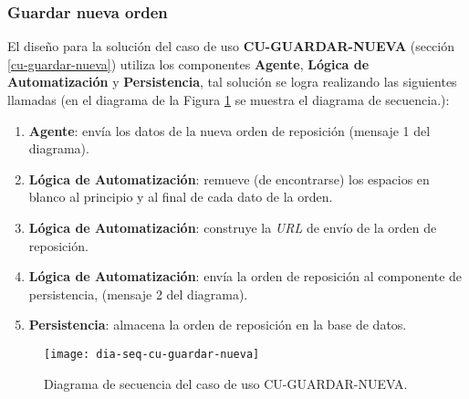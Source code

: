 \subsubsection{Guardar nueva orden}
El diseño para la solución del caso de uso \textbf{CU-GUARDAR-NUEVA} (sección \ref{cu-guardar-nueva}) utiliza los componentes \textbf{Agente}, \textbf{Lógica de Automatización} y \textbf{Persistencia}, tal solución se logra realizando las siguientes llamadas (en el diagrama de la Figura \ref{fig:dia-seq-cu-guardar-nueva} se muestra el diagrama de secuencia.):
\begin{enumerate}
	\item \textbf{Agente}: envía los datos de la nueva orden de reposición (mensaje 1 del diagrama).
	\item \textbf{Lógica de Automatización}: remueve (de encontrarse) los espacios en blanco al principio y al final de cada dato de la orden.
	\item \textbf{Lógica de Automatización}: construye la \textit{URL} de envío de la orden de reposición.
	\item \textbf{Lógica de Automatización}: envía la orden de reposición al componente de persistencia, (mensaje 2 del diagrama).
	\item \textbf{Persistencia}: almacena la orden de reposición en la base de datos.
\end{enumerate}

\begin{figure}[h]
	\centering
	\texttt{[image: dia-seq-cu-guardar-nueva]}
	\caption{Diagrama de secuencia del caso de uso CU-GUARDAR-NUEVA.}
	\label{fig:dia-seq-cu-guardar-nueva}
\end{figure}

